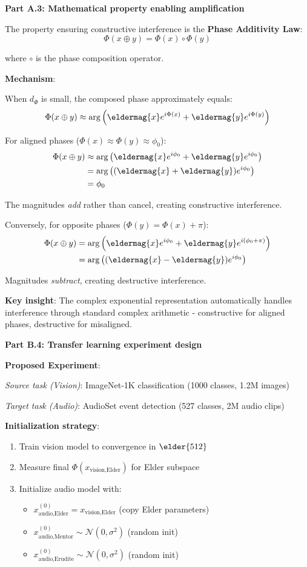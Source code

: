 \textbf{Part A.3: Mathematical property enabling amplification}

The property ensuring constructive interference is the \textbf{Phase Additivity Law}:
$$\Phi(x \oplus y) = \Phi(x) \circ \Phi(y)$$

where $\circ$ is the phase composition operator.

\textbf{Mechanism}:

When $d_{\Phi}$ is small, the composed phase approximately equals:
$$\Phi(x \oplus y) \approx \arg\left(\eldermag{x} e^{i\Phi(x)} + \eldermag{y} e^{i\Phi(y)}\right)$$

For aligned phases ($\Phi(x) \approx \Phi(y) \approx \phi_0$):
\begin{align}
\Phi(x \oplus y) &\approx \arg\left(\eldermag{x} e^{i\phi_0} + \eldermag{y} e^{i\phi_0}\right) \\
&= \arg\left((\eldermag{x} + \eldermag{y}) e^{i\phi_0}\right) \\
&= \phi_0
\end{align}

The magnitudes \textit{add} rather than cancel, creating constructive interference.

Conversely, for opposite phases ($\Phi(y) = \Phi(x) + \pi$):
\begin{align}
\Phi(x \oplus y) &= \arg\left(\eldermag{x} e^{i\phi_0} + \eldermag{y} e^{i(\phi_0 + \pi)}\right) \\
&= \arg\left((\eldermag{x} - \eldermag{y}) e^{i\phi_0}\right)
\end{align}

Magnitudes \textit{subtract}, creating destructive interference.

\textbf{Key insight}: The complex exponential representation automatically handles interference through standard complex arithmetic - constructive for aligned phases, destructive for misaligned.

\textbf{Part B.4: Transfer learning experiment design}

\textbf{Proposed Experiment}:

\textit{Source task (Vision)}: ImageNet-1K classification (1000 classes, 1.2M images)

\textit{Target task (Audio)}: AudioSet event detection (527 classes, 2M audio clips)

\textbf{Initialization strategy}:
\begin{enumerate}
\item Train vision model to convergence in $\elder{512}$
\item Measure final $\Phi(x_{\text{vision,Elder}})$ for Elder subspace
\item Initialize audio model with:
\begin{itemize}
\item $x_{\text{audio,Elder}}^{(0)} = x_{\text{vision,Elder}}$ (copy Elder parameters)
\item $x_{\text{audio,Mentor}}^{(0)} \sim \mathcal{N}(0, \sigma^2)$ (random init)
\item $x_{\text{audio,Erudite}}^{(0)} \sim \mathcal{N}(0, \sigma^2)$ (random init)
\end{itemize}
\end{enumerate}

